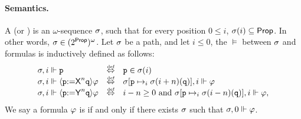 \paragraph{Semantics.} A  (or ) is an $\omega$-sequence $\sigma$, such that for every position $0\leq i$, $\sigma(i) \subseteq {\rm \sf Prop}$. In other words, $\sigma\in(2^{\rm \sf Prop})^\omega$. 
Let $\sigma$ be a path, and let $i\leq 0$, the  $\models$ between $\sigma$ and formulas is inductively defined as follows:
\[
\begin{array}{lcl}
\apath,i \models \avarprop & \iffdef & \avarprop\in\apath(i) \\
\apath,i \models \Assign{\avarprop}{\Nextn\avarpropbis}\aformula & \iffdef & \apath[\avarprop\mapsto_i \apath(i+n)(\avarpropbis)],i \models \aformula \\ 
\apath,i \models \Assign{\avarprop}{\Prevn\avarpropbis}\aformula & \iffdef & i-n \geq 0 \mbox{ and } \apath[\avarprop\mapsto_i \apath(i-n)(\avarpropbis)],i \models \aformula,
\end{array}
\]
We say a formula $\varphi$ is  if and only if there exists $\sigma$ such that $\sigma,0\Vdash\varphi$.

